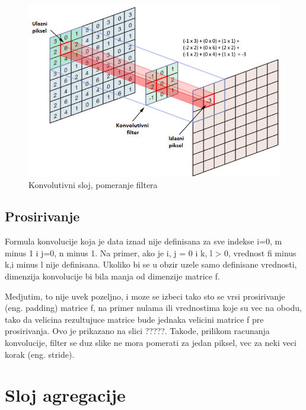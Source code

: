 \documentclass[a4paper]{article}
\begin{document}
\begin{figure}[h!]
\begin{center}
\includegraphics[scale=0.9]{convolution.png}
\end{center}
\caption{Konvolutivni sloj, pomeranje filtera}
\label{fig:convolution}
\end{figure}

\subsection{Prosirivanje}

Formula konvolucije koja je data iznad nije definisana za sve indekse i=0, m minus 1 i j=0, n minus 1.
 Na primer, ako je i, j = 0 i k, l > 0, vrednost fi minus k,i minus l nije definisana. Ukoliko bi se u obzir uzele samo definisane vrednosti, dimenzija konvolucije bi bila manja od dimenzije matrice f.
 
Medjutim, to nije uvek pozeljno, i moze se izbeci tako sto se vrsi prosirivanje (eng. padding) matrice f, na primer nulama ili vrednostima koje su vec na obodu, tako da velicina rezultujuce matrice bude jednaka velicini matrice f pre prosirivanja. Ovo je prikazano na slici ?????. Takode, prilikom racunanja konvolucije, filter se duz slike ne mora pomerati za jedan piksel, vec za neki veci korak (eng. stride).

\section{Sloj agregacije}
\label{sec:podnaslov5}

\end{document}
